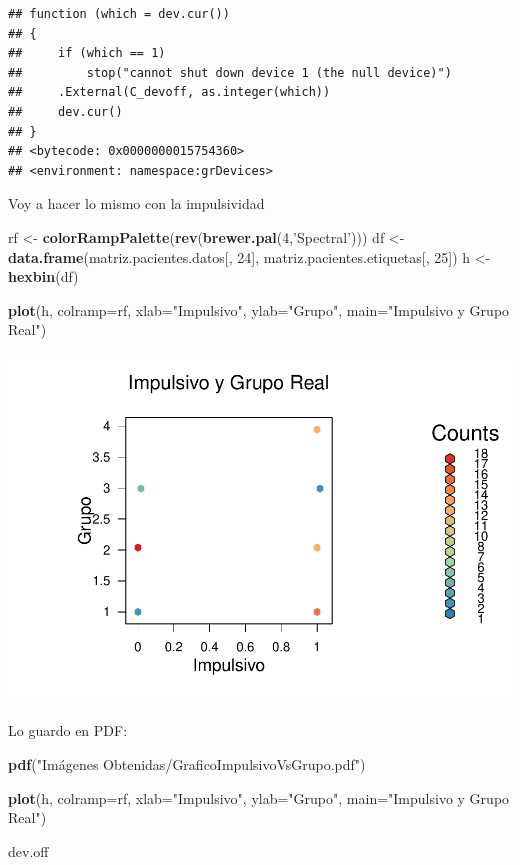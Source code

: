 \documentclass[]{article}
\newenvironment{Shaded}{\begin{snugshade}}{\end{snugshade}}
\newcommand{\KeywordTok}[1]{\textcolor[rgb]{0.13,0.29,0.53}{\textbf{#1}}}
\newcommand{\DataTypeTok}[1]{\textcolor[rgb]{0.13,0.29,0.53}{#1}}
\newcommand{\DecValTok}[1]{\textcolor[rgb]{0.00,0.00,0.81}{#1}}
\newcommand{\StringTok}[1]{\textcolor[rgb]{0.31,0.60,0.02}{#1}}
\newcommand{\NormalTok}[1]{#1}
\begin{document}
\begin{verbatim}
## function (which = dev.cur()) 
## {
##     if (which == 1) 
##         stop("cannot shut down device 1 (the null device)")
##     .External(C_devoff, as.integer(which))
##     dev.cur()
## }
## <bytecode: 0x0000000015754360>
## <environment: namespace:grDevices>
\end{verbatim}

Voy a hacer lo mismo con la impulsividad

\begin{Shaded}
\begin{Highlighting}[]
\NormalTok{rf <-}\StringTok{ }\KeywordTok{colorRampPalette}\NormalTok{(}\KeywordTok{rev}\NormalTok{(}\KeywordTok{brewer.pal}\NormalTok{(}\DecValTok{4}\NormalTok{,}\StringTok{'Spectral'}\NormalTok{)))}
\NormalTok{df <-}\StringTok{ }\KeywordTok{data.frame}\NormalTok{(matriz.pacientes.datos[, }\DecValTok{24}\NormalTok{], matriz.pacientes.etiquetas[, }\DecValTok{25}\NormalTok{])}
\NormalTok{h <-}\StringTok{ }\KeywordTok{hexbin}\NormalTok{(df)}

\KeywordTok{plot}\NormalTok{(h, }\DataTypeTok{colramp=}\NormalTok{rf, }\DataTypeTok{xlab=}\StringTok{"Impulsivo"}\NormalTok{, }\DataTypeTok{ylab=}\StringTok{"Grupo"}\NormalTok{, }\DataTypeTok{main=}\StringTok{"Impulsivo y Grupo Real"}\NormalTok{)}
\end{Highlighting}
\end{Shaded}

\includegraphics{codigo_files/figure-latex/grafico_impulsivo_grupo-1.pdf}

Lo guardo en PDF:

\begin{Shaded}
\begin{Highlighting}[]
\KeywordTok{pdf}\NormalTok{(}\StringTok{"Imágenes Obtenidas/GraficoImpulsivoVsGrupo.pdf"}\NormalTok{)}

\KeywordTok{plot}\NormalTok{(h, }\DataTypeTok{colramp=}\NormalTok{rf, }\DataTypeTok{xlab=}\StringTok{"Impulsivo"}\NormalTok{, }\DataTypeTok{ylab=}\StringTok{"Grupo"}\NormalTok{, }\DataTypeTok{main=}\StringTok{"Impulsivo y Grupo Real"}\NormalTok{)}

\NormalTok{dev.off}
\end{Highlighting}
\end{Shaded}
\end{document}
